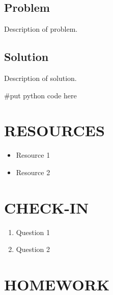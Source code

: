\documentclass[14pt]{extreport}%
\begin{document}
\subsection*{Problem}
Description of problem.
\subsection*{Solution}
Description of solution. \\
\begin{python}
#put python code here
\end{python}

\section*{RESOURCES}
\begin{itemize}
    \item Resource 1
    \item Resource 2
\end{itemize}

\section*{CHECK-IN}
\begin{enumerate}
    \item Question 1
    \item Question 2
\end{enumerate}

\section*{HOMEWORK}
\end{document}
